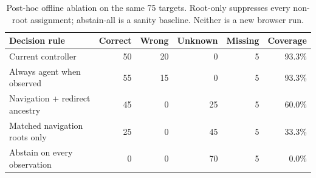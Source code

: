 \begin{table}[tb]
\centering\small
\begin{tabular}{@{}lrrrrr@{}}
\toprule
Decision rule & Correct & Wrong & Unknown & Missing & Coverage \\
\midrule
Current controller & 50 & 20 & 0 & 5 & 93.3\% \\
Always agent when observed & 55 & 15 & 0 & 5 & 93.3\% \\
Navigation + redirect ancestry & 45 & 0 & 25 & 5 & 60.0\% \\
Matched navigation roots only & 25 & 0 & 45 & 5 & 33.3\% \\
Abstain on every observation & 0 & 0 & 70 & 5 & 0.0\% \\
\bottomrule
\end{tabular}
\caption{Post-hoc offline ablation on the same 75 targets. Root-only suppresses every non-root assignment; abstain-all is a sanity baseline. Neither is a new browser run.}
\label{tab:ablation}
\end{table}
